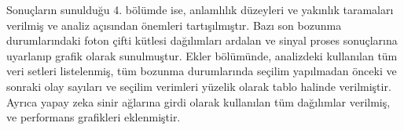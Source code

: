 Sonuçların sunulduğu 4. bölümde ise, anlamlılık düzeyleri ve yakınlık taramaları verilmiş ve analiz açısından önemleri tartışılmıştır. Bazı son bozunma durumlarındaki foton çifti kütlesi dağılımları ardalan ve sinyal proses sonuçlarına uyarlanıp grafik olarak sunulmuştur. Ekler bölümünde, analizdeki kullanılan tüm veri setleri listelenmiş, tüm bozunma durumlarında seçilim yapılmadan önceki ve sonraki olay sayıları ve seçilim verimleri yüzelik olarak tablo halinde verilmiştir. Ayrıca yapay zeka sinir ağlarına girdi olarak kullanılan tüm dağılımlar verilmiş, ve performans grafikleri eklenmiştir.